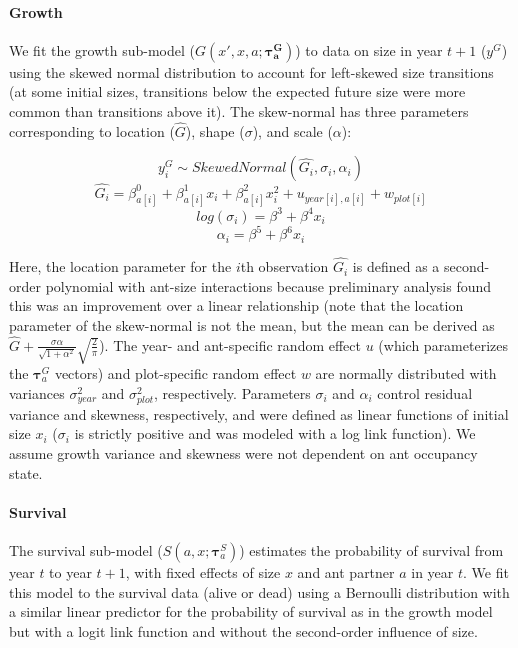 \documentclass[11pt]{article}
\begin{document}

\paragraph{Growth}
We fit the growth sub-model ($G(x',x,a;\pmb{\tau^G_{a}})$) to data on size in year $t+1$ ($y^G$) using the skewed normal distribution to account for left-skewed size transitions (at some initial sizes, transitions below the expected future size were more common than transitions above it). 
The skew-normal has three parameters corresponding to location ($\hat{G}$), shape ($\sigma$), and scale ($\alpha$):
\begin{linenomath*}
	$$y_i^G \sim Skewed Normal(\hat{G_i},\sigma_i,\alpha_i) $$
	$$\hat{G_i} = \beta^0_{a[i]} + \beta^1_{a[i]} x_i + \beta^2_{a[i]} x_i^2 + u_{year[i],a[i]} + w_{plot[i]} $$
	$$log(\sigma_i)  = \beta^3 + \beta^4 x_i $$
	$$\alpha_i = \beta^5 + \beta^6 x_i$$
	\label{eqn:growth}
\end{linenomath*}
Here, the location parameter for the $i$th observation $\hat{G_i}$ is defined as a second-order polynomial with ant-size interactions because  preliminary analysis found this was an improvement over a linear relationship (note that the location parameter of the skew-normal is not the mean, but the mean can be derived as $\hat{G} + \frac{\sigma\alpha}{\sqrt{1+\alpha^2}} \sqrt{\frac{2}{\pi}}$). 
The year- and ant-specific random effect $u$ (which parameterizes the $\pmb{\tau}^G_{a}$ vectors) and plot-specific random effect $w$ are normally distributed with variances $\sigma^2_{year}$ and $\sigma^2_{plot}$, respectively. 
Parameters $\sigma_i$ and $\alpha_i$  control residual variance and skewness, respectively, and were defined as linear functions of initial size $x_i$ ($\sigma_i$ is strictly positive and was modeled with a log link function). 
We assume growth variance and skewness were not dependent on ant occupancy state. 

\paragraph{Survival}
The survival sub-model ($S(a,x;\pmb{\tau}_{a}^{S})$) estimates the probability of survival from year $t$ to year $t+1$, with fixed effects of size $x$ and ant partner $a$ in year $t$.
We fit this model to the survival data (alive or dead) using a Bernoulli distribution with a similar linear predictor for the probability of survival as in the growth model but with a logit link function and without the second-order influence of size.
\end{document}

